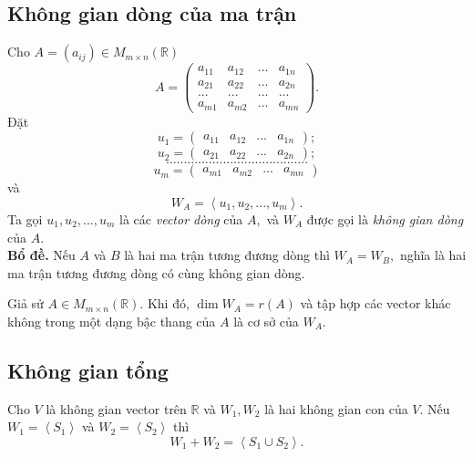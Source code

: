\subsection{Không gian dòng của ma trận}
Cho $A = \left( {a_{ij}} \right) \in M_{m \times n} \left( {\mathbb{R}} \right)$ 
\[A = \left( {\begin{array}{*{20}{c}}
  {{a_{11}}}&{{a_{12}}}&{...}&{{a_{1n}}} \\ 
  {{a_{21}}}&{{a_{22}}}&{...}&{{a_{2n}}} \\ 
  {...}&{...}&{...}&{...} \\ 
  {{a_{m1}}}&{{a_{m2}}}&{...}&{{a_{mn}}} 
\end{array}} \right).\]
Đặt 
$${u_1} = \left( {\begin{array}{*{20}{c}}
  {{a_{11}}}&{{a_{12}}}&{...}&{{a_{1n}}} 
\end{array}} \right);$$
$${u_2} = \left( {\begin{array}{*{20}{c}}
  {{a_{21}}}&{{a_{22}}}&{...}&{{a_{2n}}} 
\end{array}} \right);$$
$$........................................$$
$${u_m} = \left( {\begin{array}{*{20}{c}}
  {{a_{m1}}}&{{a_{m2}}}&{...}&{{a_{mn}}} 
\end{array}} \right)$$
và
$${W_A} = \left\langle {{u_1},{u_2},...,{u_m}} \right\rangle .$$
Ta gọi ${{u_1},{u_2},...,{u_m}}$ là các \textit{vector dòng} của $A,$ và $W_A$ được gọi là \textit{không gian dòng} của $A.$\\
\textbf{Bổ đề.} Nếu $A$ và $B$ là hai ma trận tương đương dòng thì $W_A = W_B,$ nghĩa là hai ma trận tương đương dòng có cùng không gian dòng. 
\begin{mybox}
\begin{theorem}
Giả sử $A \in M_{m \times n} \left( {\mathbb{R}} \right).$ Khi đó, $\dim W_A = r \left( A \right)$ và tập hợp các vector khác không trong một dạng bậc thang của $A$ là cơ sở của $W_A.$
\end{theorem}
\end{mybox}
\subsection{Không gian tổng}
\begin{mybox}
\begin{theorem}
Cho $V$ là không gian vector trên $\mathbb{R}$ và $W_1, W_2$ là hai không gian con của $V.$ Nếu $W_1 = \left\langle {S_1} \right\rangle$ và $W_2 = \left\langle {S_2} \right\rangle$ thì
$$W_1 + W_2 = \left\langle {S_1 \cup S_2} \right\rangle.$$
\end{theorem}
\end{mybox}
